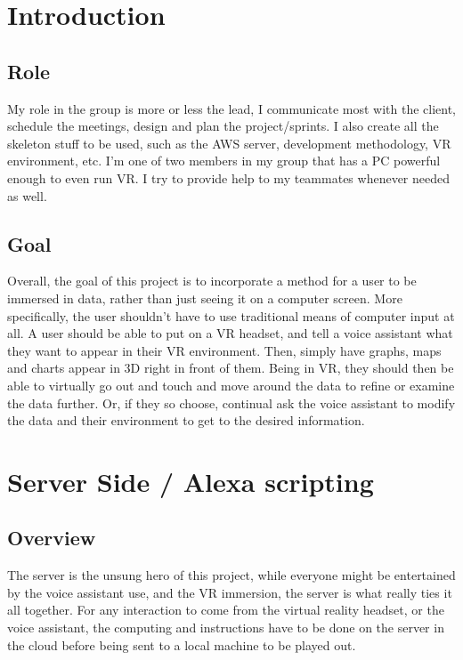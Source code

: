 \documentclass[onecolumn, draftclsnofoot,10pt, compsoc]{IEEEtran}
\begin{document}
\section{Introduction}
    \subsection{Role}
        My role in the group is more or less the lead, I communicate most with the client, schedule the meetings, design and plan the project/sprints. I also create all the skeleton stuff to be used, such as the AWS server, development methodology,  VR environment, etc. I’m one of two members in my group that has a PC powerful enough to even run VR. I try to provide help to my teammates whenever needed as well. 
        
    \subsection{Goal}
        Overall, the goal of this project is to incorporate a method for a user to be immersed in data, rather than just seeing it on a computer screen. More specifically, the user shouldn’t have to use traditional means of computer input at all. A user should be able to put on a VR headset, and tell a voice assistant what they want to appear in their VR environment. Then, simply have graphs, maps and charts appear in 3D right in front of them. Being in VR, they should then be able to virtually go out and touch and move around the data to refine or examine the data further. Or, if they so choose, continual ask the voice assistant to modify the data and their environment to get to the desired information. 

\section{Server Side / Alexa scripting}
    \subsection{Overview}
        The server is the unsung hero of this project, while everyone might be entertained by the voice assistant use, and the VR immersion, the server is what really ties it all together. For any interaction to come from the virtual reality headset, or the voice assistant, the computing and instructions have to be done on the server in the cloud before being sent to a local machine to be played out. 
\end{document}
